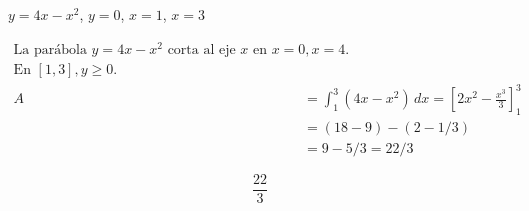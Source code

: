 $y=4x-x^2$, $y=0$, $x=1$, $x=3$

\nopagebreak
\begin{align*}
\text{La parábola } y=4x-x^2 \text{ corta al eje } x \text{ en } x=0, x=4. \\
\text{En } [1,3], y \ge 0. \\
A &= \int_{1}^{3} (4x-x^2) \, dx = \left[ 2x^2 - \frac{x^3}{3} \right]_{1}^{3} \\
&= (18 - 9) - (2 - 1/3) \\
&= 9 - 5/3 = 22/3
\end{align*}

\[
\boxed{\displaystyle \frac{22}{3}}
\]
